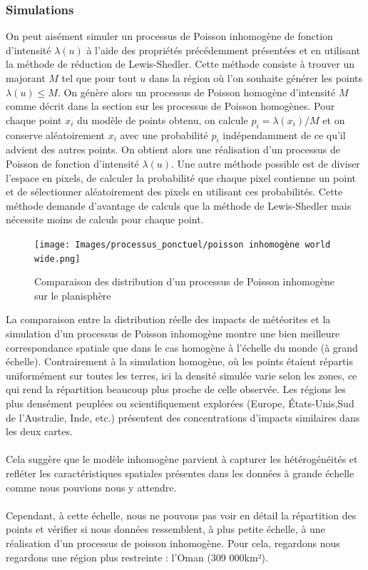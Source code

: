 \documentclass[12pt]{article}
\begin{document}
\subsubsection*{Simulations}
On peut aisément simuler un processus de Poisson inhomogène de fonction d'intensité $\lambda(u)$ à l'aide des propriétés précédemment présentées et en utilisant la méthode de réduction de Lewis-Shedler. Cette méthode consiste à trouver un majorant $M$ tel que pour tout $u$ dans la région où l'on souhaite générer les points $\lambda(u) \leq M$. On génère alors un processus de Poisson homogène d'intensité $M$ comme décrit dans la section sur les processus de Poisson homogènes. Pour chaque point $x_i$ du modèle de points obtenu, on calcule $p_i = \lambda(x_i)/M$ et on conserve aléatoirement $x_i$ avec une probabilité $p_i$ indépendamment de ce qu'il advient des autres points. On obtient alors une réalisation d'un processus de Poisson de fonction d'intensité $\lambda(u)$. Une autre méthode possible est de diviser l'espace en pixels, de calculer la probabilité que chaque pixel contienne un point et de sélectionner aléatoirement des pixels en utilisant ces probabilités. Cette méthode demande d'avantage de calculs que la méthode de Lewis-Shedler mais nécessite moins de calculs pour chaque point.
\begin{figure}[H]
    \centering
    \texttt{[image: Images/processus\_ponctuel/poisson inhomogène world wide.png]}
    \caption{Comparaison des distribution d'un processus de Poisson inhomogène sur le planisphère}
\end{figure}
La comparaison entre la distribution réelle des impacts de météorites et la simulation d’un processus de Poisson inhomogène montre une bien meilleure correspondance spatiale que dans le cas homogène à l'échelle du monde (à grand échelle). Contrairement à la simulation homogène, où les points étaient répartis uniformément sur toutes les terres, ici la densité simulée varie selon les zones, ce qui rend la répartition beaucoup plus proche de celle observée. Les régions les plus densément peuplées ou scientifiquement explorées (Europe, États-Unis,Sud de l'Australie, Inde, etc.) présentent des concentrations d’impacts similaires dans les deux cartes.\\
\\
Cela suggère que le modèle inhomogène parvient à capturer les hétérogénéités et refléter les caractéristiques spatiales présentes dans les données à grande échelle comme nous pouvions nous y attendre.\\
\\
Cependant, à cette échelle, nous ne pouvons pas voir en détail la répartition des points et vérifier si nous données ressemblent, à plus petite échelle, à une réalisation d'un processus de poisson inhomogène. Pour cela, regardons nous regardons une région plus restreinte : l'Oman (309 000km²).\\
\end{document}
